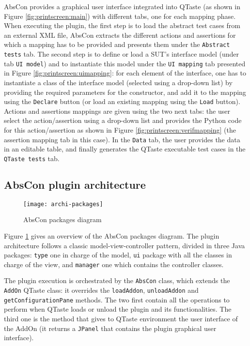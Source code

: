 AbsCon provides a graphical user interface integrated into QTaste (as shown in Figure \ref{fig:printscreen:main}) with different tabs, one for each mapping phase. When executing the plugin, the first step is to load the abstract test cases from an external XML file, AbsCon extracts the different actions and assertions for which a mapping has to be provided and presents them under the \texttt{Abstract tests} tab. 
The second step is to define or load a SUT's interface model (under tab \texttt{UI model}) and to instantiate this model under the \texttt{UI mapping} tab presented in Figure \ref{fig:printscreen:uimapping}: for each element of the interface, one has to instantiate a class of the interface model (selected using a drop-down list) by providing the required parameters for the constructor, and add it to the mapping using the \texttt{Declare} button (or load an existing mapping using the \texttt{Load} button). Actions and assertions mappings are given using the two next tabs: the user select the action/assertion using a drop-down list and provides the Python code for this action/assertion as shown in Figure \ref{fig:printscreen:verifmapping} (the assertion mapping tab in this case). In the \texttt{Data} tab, the user provides the data in an editable table, and finally generates the QTaste executable test cases in the \texttt{QTaste tests} tab.

\subsection{AbsCon plugin architecture}

\begin{figure}[t]
	\centering
	\texttt{[image: archi-packages]}
	\caption{AbsCon packages diagram}
	\label{fig:abscon:archi-packages}
\end{figure}

Figure \ref{fig:abscon:archi-packages} gives an overview of the AbsCon packages diagram. The plugin architecture follows a classic model-view-controller pattern, divided in three Java packages: \texttt{type} one in charge of the model, \texttt{ui} package with all the classes in charge of the view, and \texttt{manager} one which contains the controller classes. 

The plugin execution is orchestrated by the \texttt{AbsCon} class, which extends the \texttt{AddOn} QTaste class: it overrides the \texttt{loadAddon}, \texttt{unloadAddon} and \texttt{get\-Confi\-gu\-ra\-tion\-Pane} methods. The two first contain all the operations to perform when QTaste loads or unload the plugin and its functionalities. The third one is the method that gives to QTaste environment the user interface of the AddOn (\ie it returns a \texttt{JPanel} that contains the plugin graphical user interface).

